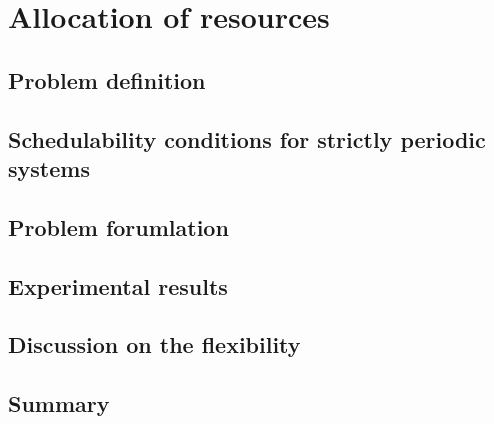 \documentclass[main.tex]{subfiles}
\begin{document}
\chapter{Allocation of resources}
\thispagestyle{chapstyle}
\minitoc

\section{Problem definition}

\section{Schedulability conditions for strictly periodic systems}

\section{Problem forumlation}

\section{Experimental results}

\section{Discussion on the flexibility}

\section{Summary}


\clearpage
\subbiblio
\end{document}
